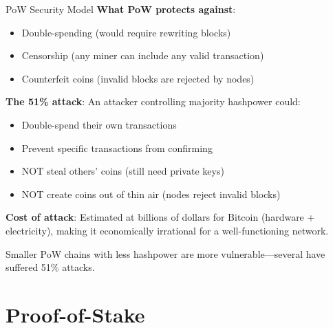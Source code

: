 \documentclass[10pt]{beamer}
\newcommand{\bad}[1]{\textcolor{AccentOrange}{#1}}
\begin{document}
\begin{frame}{PoW Security Model}
  \textbf{What PoW protects against}:
  \begin{itemize}
    \item Double-spending (would require rewriting blocks)
    \item Censorship (any miner can include any valid transaction)
    \item Counterfeit coins (invalid blocks are rejected by nodes)
  \end{itemize}
  
  \vspace{1em}
  \textbf{The 51\% attack}: An attacker controlling majority hashpower could:
  \begin{itemize}
    \item Double-spend their own transactions
    \item Prevent specific transactions from confirming
    \item \bad{NOT} steal others' coins (still need private keys)
    \item \bad{NOT} create coins out of thin air (nodes reject invalid blocks)
  \end{itemize}
  
  \vspace{1em}
  \textbf{Cost of attack}: Estimated at billions of dollars for Bitcoin (hardware + electricity), making it economically irrational for a well-functioning network.
  
  \vspace{0.5em}
  Smaller PoW chains with less hashpower are more vulnerable---several have suffered 51\% attacks.
\end{frame}

\section{Proof-of-Stake}
\end{document}

